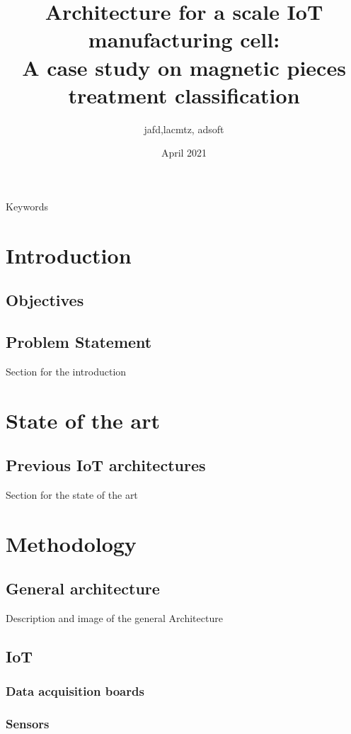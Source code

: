 \documentclass{article}
\title{Architecture for a scale IoT manufacturing cell:\\
A case study on magnetic pieces treatment classification}
\author{jafd,lacmtz, adsoft }
\date{April 2021}
\begin{document}
\maketitle

\begin{abstract}

\end{abstract}

Keywords

\section{Introduction}

\subsection{Objectives}
\subsection{Problem Statement}
Section for the introduction

\section{State of the art}
\subsection{Previous IoT architectures}
Section for the state of the art

\section{Methodology}
\subsection{General architecture}
Description and image of the general Architecture

\subsection{IoT}
\subsubsection{Data acquisition boards}
\subsubsection{Sensors}
\end{document}
